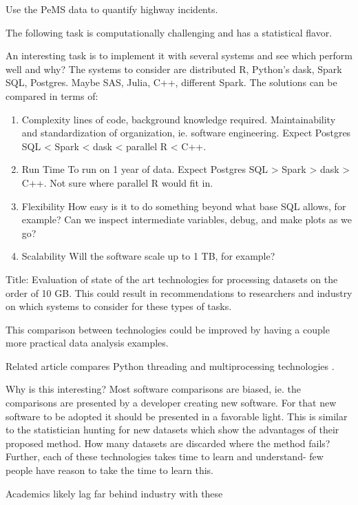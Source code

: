 \documentclass[12pt]{article}
\begin{document}
Use the PeMS data to quantify highway incidents.

The following task is computationally challenging and has a statistical
flavor.


An interesting task is to implement it with several systems and see which
perform well and why? The systems to consider are distributed R, Python's
dask, Spark SQL, Postgres. Maybe SAS, Julia, C++, different Spark. The solutions can be compared in terms
of:
\begin{enumerate}
    \item{Complexity} lines of code, background knowledge required.
        Maintainability and standardization of organization, ie. software
        engineering.
        Expect Postgres SQL < Spark < dask < parallel R < C++.
    \item{Run Time} To run on 1 year of data.
        Expect Postgres SQL > Spark > dask > C++. Not sure where parallel R
        would fit in.
    \item{Flexibility} How easy is it to do something beyond what base SQL
        allows, for example? Can we inspect intermediate variables, debug,
        and make plots as we go?
    \item{Scalability} Will the software scale up to 1 TB, for example?
\end{enumerate}

Title: Evaluation of state of the art technologies for processing datasets
on the order of 10 GB. This could result in recommendations to researchers
and industry on which systems to consider for these types of tasks.

This comparison between technologies could be improved by having a couple
more practical data analysis examples.

Related article compares Python threading and multiprocessing
technologies \cite{malakhov2016composable}.

Why is this interesting? Most software comparisons are biased, ie. the
comparisons are presented by a developer creating new software. For that
new software to be adopted it should be presented in a favorable light. 
This is similar to the statistician hunting for new datasets which show the
advantages of their proposed method. How many datasets are discarded where
the method fails?
Further, each of these technologies takes time to learn and understand-
few people have reason to take the time to learn this.

Academics likely lag far behind industry with these
\end{document}
